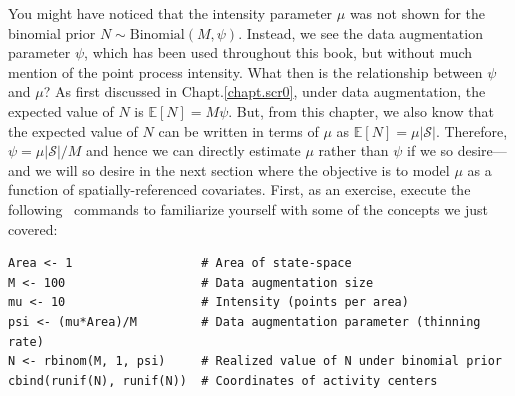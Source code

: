 You might have noticed that the intensity parameter $\mu$ was not shown for the
binomial prior $N \sim \text{Binomial}(M, \psi)$. Instead, we see the
data augmentation parameter $\psi$, which has been used throughout
this book, but without much mention of the point process
intensity. What then is the relationship between $\psi$ and $\mu$?
As first discussed in Chapt.\ref{chapt.scr0}, under data augmentation,
the expected value of $N$ is $\mathbb{E}[N] = M\psi$. But, from this
chapter, we also know that the
expected value of $N$ can be written in terms of $\mu$ as
$\mathbb{E}[N] = \mu|\mathcal{S}|$. Therefore,
$\psi = \mu|\mathcal{S}| / M$ and hence we can directly estimate $\mu$
rather than $\psi$ if we so desire---and we will so desire in the next
section where the objective is to model $\mu$ as a function of
spatially-referenced covariates. First, as an exercise, execute the
following \R~commands to familiarize yourself with some of the
concepts we just covered:
\begin{verbatim}
Area <- 1                  # Area of state-space
M <- 100                   # Data augmentation size
mu <- 10                   # Intensity (points per area)
psi <- (mu*Area)/M         # Data augmentation parameter (thinning rate)
N <- rbinom(M, 1, psi)     # Realized value of N under binomial prior
cbind(runif(N), runif(N))  # Coordinates of activity centers
\end{verbatim}


